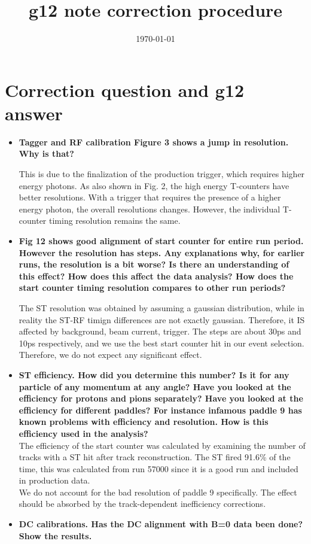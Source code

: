 \documentclass[ 12 pt]{article}
\title{g12 note correction procedure}
\date{\today}
\begin{document}
\section{Correction question and g12 answer}
\begin{itemize}
\item \textbf{Tagger and RF calibration Figure 3 shows a jump in resolution. Why is that?}


This is due to the finalization of the production trigger, which requires higher energy photons. As also shown in Fig. 2, the high energy T-counters have better resolutions. With a trigger that requires the presence of a higher energy photon, the overall resolutions changes. However, the individual T-counter timing resolution remains the same.

\item \textbf{Fig 12 shows good alignment of start counter for entire run period. However the resolution has steps. Any explanations why, for earlier runs, the resolution is a bit worse? Is there an understanding of this effect? How does this affect the data analysis? How does the start counter timing resolution compares to other run periods?}

The ST resolution was obtained by assuming a gaussian distribution, while in reality the ST-RF timign differences are not exactly gaussian. Therefore, it IS affected by background, beam current, trigger. The steps are about 30ps and 10ps respectively, and we use the best start counter hit in our event selection. Therefore, we do not expect any significant effect.

\item \textbf{ST efficiency. How did you determine this number? Is it for any particle of any momentum at any angle? Have you looked at the efficiency for protons and pions separately? Have you looked at the efficiency for different paddles?
For instance infamous paddle 9 has known problems with efficiency and resolution. How is this efficiency used in the analysis?}\\
The efficiency of the start counter was calculated by examining the number of tracks with a ST hit after track reconstruction. The ST fired 91.6\% of the time, this was calculated from run 57000 since it is a good run and included in production data.\\ We do not account for the bad resolution of paddle 9 specifically. The effect should be absorbed by the track-dependent inefficiency corrections.

\item \textbf{DC calibrations. Has the DC alignment with B=0 data been done? Show the results.}


\end{itemize}
\end{document}

